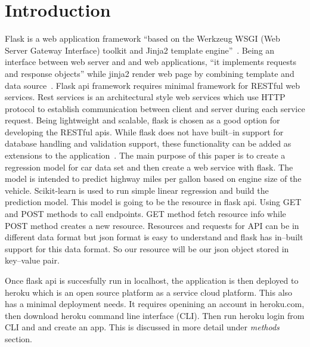 \section{Introduction}
  Flask is a web application framework ``based on the Werkzeug WSGI (Web Server
  Gateway Interface) toolkit and Jinja2 template engine''~\cite{hid-sp18-415-flask}.
  Being an interface between web server and and web applications, 
  ``it implements requests and response objects'' while jinja2 render web page
  by combining template and data source~\cite{hid-sp18-415-www-flask}. 
  Flask api framework requires minimal framework for RESTful web services.
  Rest services is an architectural style web services which use HTTP protocol
  to establish communication between client and server during each service
  request.
  Being lightweight and scalable, flask is chosen as a good option for 
  developing the RESTful apis. While flask does not have built--in support for 
  database handling and validation support, these functionality can be added as
  extensions to the application~\cite{hid-sp18-415-www-flask}.
  The main purpose of this paper is
  to create a regression model for car data set and then create a web service
  with flask. The model is intended to
  predict highway miles per gallon based on engine size of the vehicle.
  Scikit-learn is used to run simple linear regression and build the prediction
  model. This model is going
  to be the resource in flask api. Using GET and POST methods to call
  endpoints. GET method fetch resource info while POST method creates
  a new resource. Resources and requests for API can be in different data
  format but json format
  is easy to understand and flask has in--built support for this data format. So 
  our resource will be our json object stored in key--value pair.
  
  Once flask api is succesfully run in localhost, the application is
  then deployed to heroku which is an open source platform as a 
  service cloud platform. This also has a minimal deployment needs.
  It requires openining an account in heroku.com, then download heroku
  command line interface (CLI). Then run heroku login from CLI and
  and create an app. This is discussed in more detail under \textit{methods} 
  section.
  
 
 
